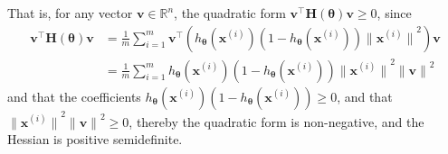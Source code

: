 That is, for any vector \( \mathbf{v} \in \mathbb{R}^n \), the quadratic form \( \mathbf{v}^\top \mathbf{H}(\mathbf{\theta}) \mathbf{v} \geq 0 \), since
\begin{align*}
    \mathbf{v}^\top \mathbf{H}(\mathbf{\theta}) \mathbf{v}
     & =
    \frac{1}{m} \sum_{i=1}^{m}
    \mathbf{v}^\top
    \left(
    h_{\mathbf{\theta}}\left(\mathbf{x}^{(i)}\right) \left(1-h_{\mathbf{\theta}}\left(\mathbf{x}^{(i)}\right)\right)
    {{\lVert \mathbf{x}^{(i)} \rVert}^2}
    \right)
    \mathbf{v}
    \\ & =
    \frac{1}{m} \sum_{i=1}^{m}
    h_{\mathbf{\theta}}\left(\mathbf{x}^{(i)}\right) \left(1-h_{\mathbf{\theta}}\left(\mathbf{x}^{(i)}\right)\right)
    {{\lVert \mathbf{x}^{(i)} \rVert}^2}
    {{\lVert \mathbf{v} \rVert}^2}
\end{align*}
and that the coefficients \( h_{\mathbf{\theta}}\left(\mathbf{x}^{(i)}\right) \left(1-h_{\mathbf{\theta}}\left(\mathbf{x}^{(i)}\right)\right) \geq 0 \), and that \( {{\lVert \mathbf{x}^{(i)} \rVert}^2}{{\lVert \mathbf{v} \rVert}^2} \geq 0 \), thereby the quadratic form is non-negative, and the Hessian is positive semidefinite.
